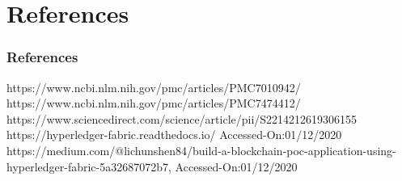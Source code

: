 \documentclass[english,hangout]{beamer}
\begin{document}
\section{References}

\begin{frame}
\frametitle{References}
\begin{thebibliography}{00}
 https://www.ncbi.nlm.nih.gov/pmc/articles/PMC7010942/
 https://www.ncbi.nlm.nih.gov/pmc/articles/PMC7474412/
 https://www.sciencedirect.com/science/article/pii/S2214212619306155
 https://hyperledger-fabric.readthedocs.io/ Accessed-On:01/12/2020
 https://medium.com/@lichunshen84/build-a-blockchain-poc-application-using-hyperledger-fabric-5a32687072b7, Accessed-On:01/12/2020
\end{thebibliography}

\end{frame}
\end{document}
